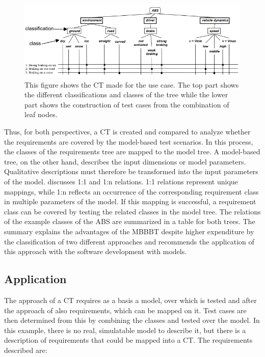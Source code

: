 \begin{figure}[H]
\centering
\includegraphics[scale=0.8]{../../individual/groeger/images/ClassificationTreeExample.png} 
\caption{This figure shows the CT made for the use case. The top part shows the different classifications and classes of the tree while the lower part shows the construction of test cases from the combination of leaf nodes.}
\label{fig:ABS_CT}
\end{figure}

Thus, for both perspectives, a CT is created and compared to analyze whether the requirements are covered by the model-based test scenarios. In this process, the classes of the requirements tree are mapped to the model tree. A model-based tree, on the other hand, describes the input dimensions or model parameters. Qualitative descriptions must therefore be transformed into the input parameters of the model. \cite{Conrad} discusses 1:1 and 1:n relations. 1:1 relations represent unique mappings, while 1:n reflects an occurrence of the corresponding requirement class in multiple parameters of the model. If this mapping is successful, a requirement class can be covered by testing the related classes in the model tree. The relations of the example classes of the ABS are summarized in a table for both trees. The summary explains the advantages of the MBBBT despite higher expenditure by the classification of two different approaches and recommends the application of this approach with the software development with models.

\subsection{Application}

The approach of a CT requires as a basis a model, over which is tested and after the approach of \cite{Conrad} also requirements, which can be mapped on it. Test cases are then determined from this by combining the classes and tested over the model. In this example, there is no real, simulatable model to describe it, but there is a description of requirements that could be mapped into a CT. The requirements described are:

